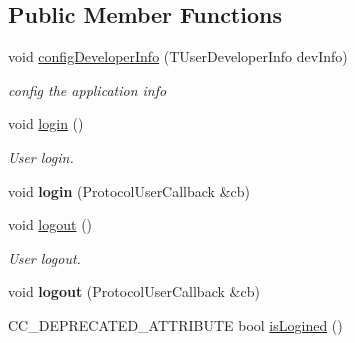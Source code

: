 \subsection*{Public Member Functions}
\begin{DoxyCompactItemize}
\item 
void \hyperlink{classcocos2d_1_1plugin_1_1ProtocolUser_a7a0064ab0a82d78b6ebb0b6c20cfed26}{config\+Developer\+Info} (T\+User\+Developer\+Info dev\+Info)
\begin{DoxyCompactList}\small\item\em config the application info \end{DoxyCompactList}\item 
\mbox{\label{classcocos2d_1_1plugin_1_1ProtocolUser_a0bbcd645ee5bc51c4a43bf3755a3b673}} 
void \hyperlink{classcocos2d_1_1plugin_1_1ProtocolUser_a0bbcd645ee5bc51c4a43bf3755a3b673}{login} ()
\begin{DoxyCompactList}\small\item\em User login. \end{DoxyCompactList}\item 
\mbox{\label{classcocos2d_1_1plugin_1_1ProtocolUser_a98cff3aea8178b5a740f099a2a023fa3}} 
void {\bfseries login} (Protocol\+User\+Callback \&cb)
\item 
\mbox{\label{classcocos2d_1_1plugin_1_1ProtocolUser_a9a4a4738193011298b8cffa41cf6e42d}} 
void \hyperlink{classcocos2d_1_1plugin_1_1ProtocolUser_a9a4a4738193011298b8cffa41cf6e42d}{logout} ()
\begin{DoxyCompactList}\small\item\em User logout. \end{DoxyCompactList}\item 
\mbox{\label{classcocos2d_1_1plugin_1_1ProtocolUser_aaac33a50b176342fa0e078fc8a7490c2}} 
void {\bfseries logout} (Protocol\+User\+Callback \&cb)
\item 
\mbox{\label{classcocos2d_1_1plugin_1_1ProtocolUser_a265ff692bf5820bb3a09a7bbf7753bcc}} 
C\+C\+\_\+\+D\+E\+P\+R\+E\+C\+A\+T\+E\+D\+\_\+\+A\+T\+T\+R\+I\+B\+U\+TE bool \hyperlink{classcocos2d_1_1plugin_1_1ProtocolUser_a265ff692bf5820bb3a09a7bbf7753bcc}{is\+Logined} ()

\end{DoxyCompactItemize}
